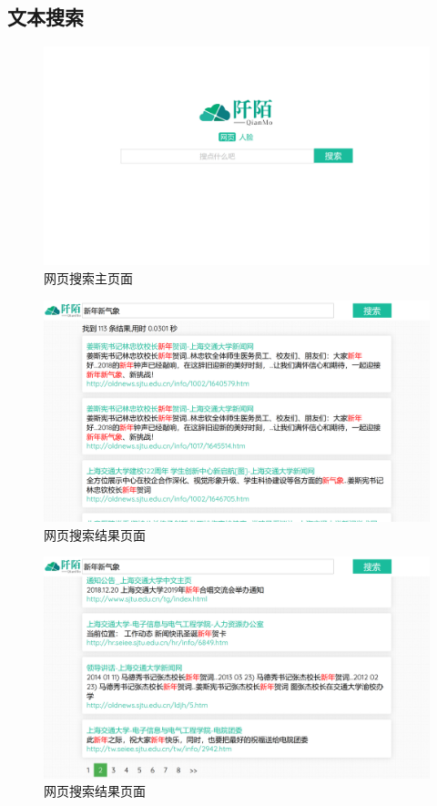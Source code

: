 \documentclass[a4paper]{article}
\begin{document}
        \subsection{文本搜索}
\begin{figure}[H]
\centering
\includegraphics[width=\textwidth]{image/html1.png}
\caption{网页搜索主页面}
\end{figure}
\begin{figure}[H]
\centering
\includegraphics[width=\textwidth]{image/html2.png}
\caption{网页搜索结果页面}
\end{figure}
\begin{figure}[H]
\centering
\includegraphics[width=\textwidth]{image/html3.png}
\caption{网页搜索结果页面}
\end{figure}
\end{document}
